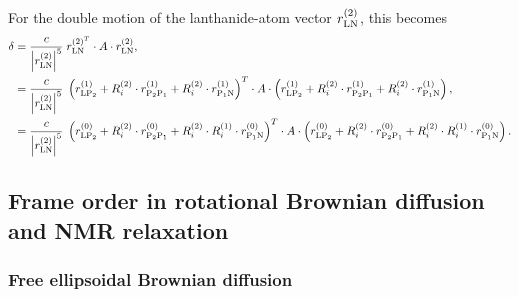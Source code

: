 For the double motion of the lanthanide-atom vector $r_{\textrm{LN}}^{(2)}$, this becomes
\begin{subequations}
\begin{align}
    \delta &= \frac{c}{\left| r_{\textrm{LN}}^{(2)} \right|^5} \;
                    r_{\textrm{LN}}^{(2)^T} \cdot A \cdot r_{\textrm{LN}}^{(2)} , \\
           &= \frac{c}{\left| r_{\textrm{LN}}^{(2)} \right|^5} \;
                    \left( r_{\textrm{LP}_2}^{(1)} + R_i^{(2)} \cdot r_{\textrm{P}_2 \textrm{P}_1}^{(1)} + R_i^{(2)} \cdot r_{\textrm{P}_1 \textrm{N}}^{(1)} \right)^T
                    \cdot A \cdot
                    \left( r_{\textrm{LP}_2}^{(1)} + R_i^{(2)} \cdot r_{\textrm{P}_2 \textrm{P}_1}^{(1)} + R_i^{(2)} \cdot r_{\textrm{P}_1 \textrm{N}}^{(1)} \right) , \\
           &= \frac{c}{\left| r_{\textrm{LN}}^{(2)} \right|^5} \;
                    \left( r_{\textrm{LP}_2}^{(0)} + R_i^{(2)} \cdot r_{\textrm{P}_2 \textrm{P}_1}^{(0)} + R_i^{(2)} \cdot R_i^{(1)} \cdot r_{\textrm{P}_1 \textrm{N}}^{(0)} \right)^T
                    \cdot A \cdot
                    \left( r_{\textrm{LP}_2}^{(0)} + R_i^{(2)} \cdot r_{\textrm{P}_2 \textrm{P}_1}^{(0)} + R_i^{(2)} \cdot R_i^{(1)} \cdot r_{\textrm{P}_1 \textrm{N}}^{(0)} \right) .
\end{align}
\end{subequations}





\subsection{Frame order in rotational Brownian diffusion and NMR relaxation}




\subsubsection{Free ellipsoidal Brownian diffusion}
\label{sect: Free ellipsoidal Brownian diffusion}

